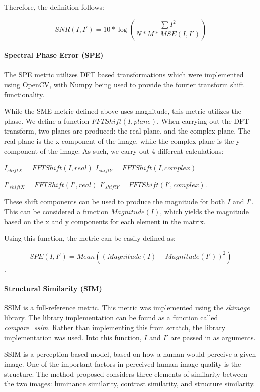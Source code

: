 \documentclass[10pt,a4paper]{article}
\begin{document}
                Therefore, the definition follows:

                $$SNR(I, I') = 10 * \log(\frac{\sum I^2}{N * M * MSE(I, I')})$$

            \paragraph{Spectral Phase Error (SPE)}
                The SPE metric utilizes DFT based transformations which were implemented using OpenCV, with Numpy being used to provide the fourier transform shift functionality.

                While the SME metric defined above uses magnitude, this metric utilizes the phase. We define a function $FFTShift(I, plane)$. When carrying out the DFT transform,
                two planes are produced: the real plane, and the complex plane. The real plane is the x component of the image, while the complex plane is the y component of the image.
                As such, we carry out 4 different calculations:

                $I_{shiftX} = FFTShift(I, real)$
                $I_{shiftY} = FFTShift(I, complex)$

                $I'_{shiftX} = FFTShift(I', real)$
                $I'_{shiftY} = FFTShift(I', complex)$.

                These shift components can be used to produce the magnitude for both $I$ and $I'$. This can be considered a function $Magnitude(I)$, which yields the magnitude based on the
                x and y components for each element in the matrix.

                Using this function, the metric can be easily defined as:

                $$SPE(I, I') = Mean((Magnitude(I) - Magnitude(I'))^2)$$.

            \paragraph{Structural Similarity (SIM)}
                SSIM is a full-reference metric. This metric was implemented using the \emph{skimage} library. The library implementation can be found as a function called \emph{compare\_ssim}.
                Rather than implementing this from scratch, the library implementation was used. Into this function, $I$ and $I'$ are passed in as arguments.

                SSIM is a perception based model, based on how a human would perceive a given image. One of the important factors in perceived human image quality is the structure.
                The method proposed considers three elements of similarity between the two images: luminance similarity, contrast similarity, and structure similarity.
                \cite{SSIMPaper}
\end{document}
